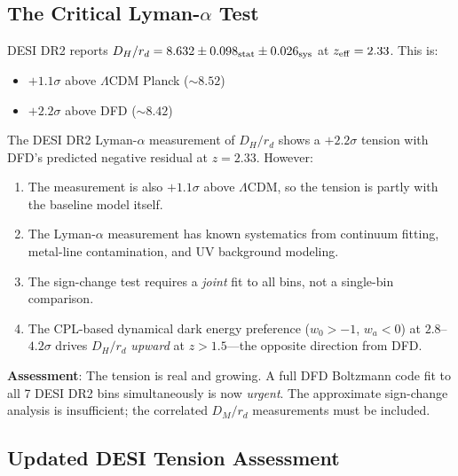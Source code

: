 \documentclass[11pt,a4paper]{article}
\newcounter{findingctr}
\newenvironment{finding}[1][]{%
  \refstepcounter{findingctr}%
  \begin{tcolorbox}[colback=blue!3!white, colframe=blue!50!black,
    title=\textbf{Finding \thefindingctr: #1}]
}{%
  \end{tcolorbox}%
}
\newcommand{\LCDM}{$\Lambda$CDM}
\begin{document}
\subsection{The Critical Lyman-$\alpha$ Test}

DESI DR2 reports $D_H/r_d = 8.632 \pm 0.098_{\rm stat} \pm 0.026_{\rm sys}$
at $z_{\rm eff} = 2.33$. This is:

\begin{itemize}[nosep]
\item $+1.1\sigma$ above \LCDM{} Planck ($\sim 8.52$)
\item $+2.2\sigma$ above DFD ($\sim 8.42$)
\end{itemize}

\begin{finding}[Lyman-$\alpha$ $D_H/r_d$ Tension Quantified]
\label{find:lya-dh}
The DESI DR2 Lyman-$\alpha$ measurement of $D_H/r_d$ shows a
$+2.2\sigma$ tension with DFD's predicted negative residual at $z = 2.33$.
However:
\begin{enumerate}[nosep]
\item The measurement is also $+1.1\sigma$ above \LCDM, so the tension
  is partly with the baseline model itself.
\item The Lyman-$\alpha$ measurement has known systematics from
  continuum fitting, metal-line contamination, and UV background modeling.
\item The sign-change test requires a \emph{joint} fit to all bins,
  not a single-bin comparison.
\item The CPL-based dynamical dark energy preference
  ($w_0 > -1$, $w_a < 0$) at $2.8$--$4.2\sigma$ drives $D_H/r_d$
  \emph{upward} at $z > 1.5$---the opposite direction from DFD.
\end{enumerate}

\textbf{Assessment}: The tension is real and growing. A full DFD
Boltzmann code fit to all 7 DESI DR2 bins simultaneously is now
\emph{urgent}. The approximate sign-change analysis is insufficient;
the correlated $D_M/r_d$ measurements must be included.
\end{finding}

\subsection{Updated DESI Tension Assessment}
\end{document}
